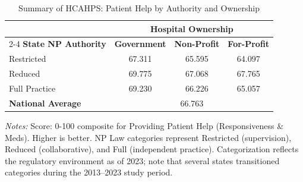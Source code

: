 \begin{table}[htbp]
    \centering
    \caption{Summary of HCAHPS: Patient Help by Authority and Ownership}
    \label{tab:hcahps_grp2}
    \vspace{0.2cm}
    \begin{tabular}{lccc}
        \toprule
        & \multicolumn{3}{c}{\textbf{Hospital Ownership}} \\
        \cmidrule(lr){2-4}
        \textbf{State NP Authority} & \textbf{Government} & \textbf{Non-Profit} & \textbf{For-Profit} \\
        \midrule
        Restricted & 67.311 & 65.595 & 64.097 \\
        Reduced & 69.775 & 67.068 & 67.765 \\
        Full Practice & 69.230 & 66.226 & 65.057 \\
        \midrule
        \textbf{National Average} & \multicolumn{3}{c}{66.763} \\
        \bottomrule
    \end{tabular}
    \vspace{0.1cm}
    \begin{minipage}{0.85\textwidth}
        \footnotesize \textit{Notes:} Score: 0-100 composite for Providing Patient Help (Responsiveness \& Meds). Higher is better. NP Law categories represent Restricted (supervision), Reduced (collaborative), and Full (independent practice). Categorization reflects the regulatory environment as of 2023; note that several states transitioned categories during the 2013--2023 study period.
    \end{minipage}
\end{table}